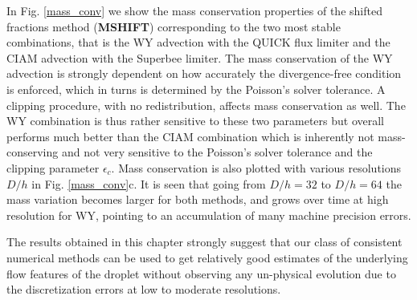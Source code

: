 In Fig. \ref{mass_conv} we show the mass conservation properties 
of the shifted fractions method (\textbf{MSHIFT}) corresponding to the two most 
stable combinations, that is the WY advection with the QUICK 
flux limiter and the CIAM advection with the Superbee limiter. 
The mass conservation of the WY advection is strongly dependent
on how accurately the divergence-free condition is enforced, which
in turns is determined by the Poisson's solver tolerance. 
A clipping procedure, with no redistribution, affects mass conservation as well.
The WY combination is thus rather sensitive to these two parameters
but overall performs much better than the CIAM combination which is
inherently not mass-conserving and not very sensitive to the Poisson's solver 
tolerance and the clipping parameter $\epsilon_{c}$.
Mass conservation is also plotted with various 
resolutions $D/h$ in Fig. \ref{mass_conv}c. 
It is seen that going from $D/h=32$ to $D/h=64$
the mass variation becomes larger for both methods, and grows over time at 
high resolution for WY, pointing to an accumulation of many machine precision errors.


The results obtained in this chapter strongly suggest that 
our class of consistent numerical methods can be used to get relatively good 
estimates of the underlying flow features of the droplet without observing 
any un-physical evolution due to the discretization errors at low to moderate resolutions.           


